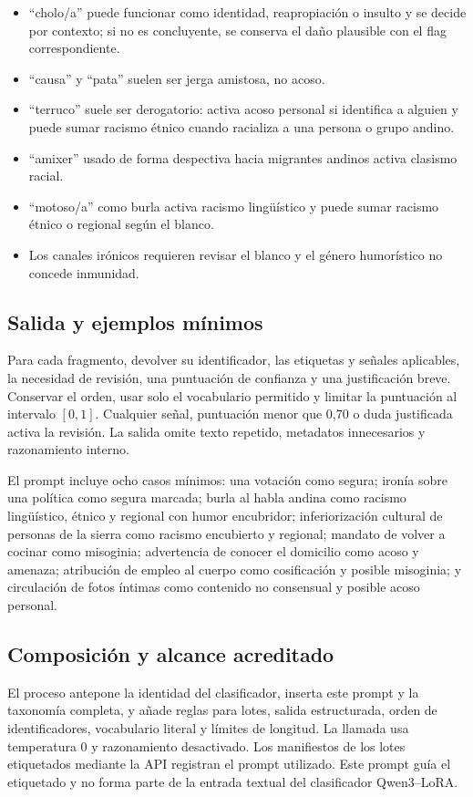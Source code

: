 \begin{itemize}
\item ``cholo/a'' puede funcionar como identidad, reapropiación o insulto y se decide por contexto; si no es concluyente, se conserva el daño plausible con el flag correspondiente.
\item ``causa'' y ``pata'' suelen ser jerga amistosa, no acoso.
\item ``terruco'' suele ser derogatorio: activa acoso personal si identifica a alguien y puede sumar racismo étnico cuando racializa a una persona o grupo andino.
\item ``amixer'' usado de forma despectiva hacia migrantes andinos activa clasismo racial.
\item ``motoso/a'' como burla activa racismo lingüístico y puede sumar racismo étnico o regional según el blanco.
\item Los canales irónicos requieren revisar el blanco y el género humorístico no concede inmunidad.
\end{itemize}

\subsection*{Salida y ejemplos mínimos}

Para cada fragmento, devolver su identificador, las etiquetas y señales aplicables, la necesidad de revisión, una puntuación de confianza y una justificación breve. Conservar el orden, usar solo el vocabulario permitido y limitar la puntuación al intervalo \([0,1]\). Cualquier señal, puntuación menor que 0,70 o duda justificada activa la revisión. La salida omite texto repetido, metadatos innecesarios y razonamiento interno.

El prompt incluye ocho casos mínimos: una votación como segura; ironía sobre una política como segura marcada; burla al habla andina como racismo lingüístico, étnico y regional con humor encubridor; inferiorización cultural de personas de la sierra como racismo encubierto y regional; mandato de volver a cocinar como misoginia; advertencia de conocer el domicilio como acoso y amenaza; atribución de empleo al cuerpo como cosificación y posible misoginia; y circulación de fotos íntimas como contenido no consensual y posible acoso personal.

\subsection*{Composición y alcance acreditado}

El proceso antepone la identidad del clasificador, inserta este prompt y la taxonomía completa, y añade reglas para lotes, salida estructurada, orden de identificadores, vocabulario literal y límites de longitud. La llamada usa temperatura 0 y razonamiento desactivado. Los manifiestos de los lotes etiquetados mediante la API registran el prompt utilizado. Este prompt guía el etiquetado y no forma parte de la entrada textual del clasificador Qwen3--LoRA.
